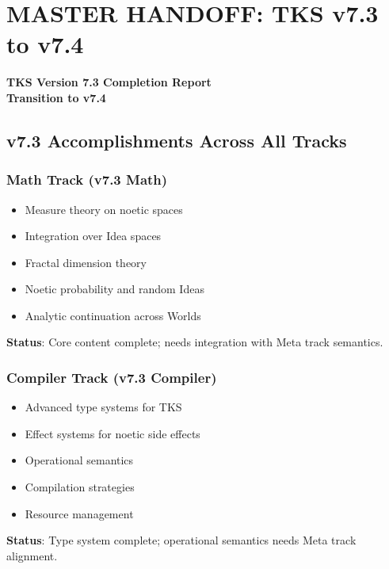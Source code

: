 \section{MASTER HANDOFF: TKS v7.3 to v7.4}
\label{sec:master-handoff}

\begin{tcolorbox}[colback=red!5!white,colframe=red!75!black,title=\textbf{MASTER HANDOFF DOCUMENT},breakable]
\begin{center}
\textbf{\Large TKS Version 7.3 Completion Report}\\[0.5em]
\textbf{Transition to v7.4}
\end{center}
\end{tcolorbox}

\subsection{v7.3 Accomplishments Across All Tracks}
\label{subsec:v73-accomplishments}

\subsubsection{Math Track (v7.3 Math)}
\begin{itemize}
  \item Measure theory on noetic spaces
  \item Integration over Idea spaces
  \item Fractal dimension theory
  \item Noetic probability and random Ideas
  \item Analytic continuation across Worlds
\end{itemize}
\textbf{Status}: Core content complete; needs integration with Meta track semantics.

\subsubsection{Compiler Track (v7.3 Compiler)}
\begin{itemize}
  \item Advanced type systems for TKS
  \item Effect systems for noetic side effects
  \item Operational semantics
  \item Compilation strategies
  \item Resource management
\end{itemize}
\textbf{Status}: Type system complete; operational semantics needs Meta track alignment.

